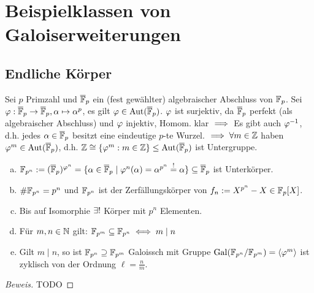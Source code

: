 \documentclass[a4paper]{report}
\begin{document}
\section{Beispielklassen von Galoiserweiterungen}
\subsection{Endliche Körper}
Sei $p$ Primzahl und $\overline {\mathbb{F}}_{p}$ ein (fest gewählter) algebraischer Abschluss von $\mathbb{F}_{p}$. Sei $\varphi: \overline {\mathbb{F}}_{p} \to \overline {\mathbb{F}}_{p} , \alpha \mapsto \alpha^{p}$, es gilt $\varphi \in \operatorname{Aut}(\overline {\mathbb{F}}_{p})$. $\varphi$ ist surjektiv, da $\overline {\mathbb{F}}_{p}$ perfekt (als algebraischer Abschluss) und $\varphi$ injektiv, Homom. klar
\newline$\implies$ Es gibt auch $\varphi^{-1}$, d.h. jedes $\alpha \in \overline {\mathbb{F}}_{p}$ besitzt eine eindeutige $p$-te Wurzel.
\newline$\implies \forall m \in \mathbb{Z}$ haben $\varphi^{m} \in \operatorname{Aut}(\overline {\mathbb{F}}_{p})$, d.h. $\mathbb{Z} \cong \{\varphi^{m}:m \in \mathbb{Z}\} \le \operatorname{Aut}(\overline {\mathbb{F}}_{p})$ ist Untergruppe.
\begin{satz}\item
\begin{enumerate}[(a)]
  \item $\mathbb{F}_{p^{n}} := (\overline {\mathbb{F}}_{p})^{\varphi^{n}} = \{\alpha \in \overline {\mathbb{F}}_{p} \mid \varphi^{n}(\alpha) = \alpha^{p^{n}} \overset != \alpha\} \subseteq \overline {\mathbb{F}}_{p}$ ist Unterkörper.
  \item $\# \mathbb{F}_{p^{n}} = p^{n}$ und $\mathbb{F}_{p^{n}}$ ist der Zerfällungskörper von $f_{n}:= X^{p^{n}} - X \in \mathbb{F}_p[X]$.
  \item Bis auf Isomorphie $\exists !$ Körper mit $p^{n}$ Elementen.
  \item Für $m, n \in \mathbb{N}$ gilt: $\mathbb{F}_{p^{m}} \subseteq \mathbb{F}_{p^{n}} \iff m \mid n$
  \item Gilt $m \mid n$, so ist $\mathbb{F}_{p^{n}} \supseteq \mathbb{F}_{p^{m}}$ Galoissch mit Gruppe $\operatorname{Gal}(\mathbb{F}_{p^{n}}/ \mathbb{F}_{p^{m}})= \langle\varphi^{m}\rangle$ ist zyklisch von der Ordnung $\ell = \frac nm$.
\end{enumerate}
\begin{proof}[Beweis]
TODO
\end{proof}
\end{satz}
\end{document}
